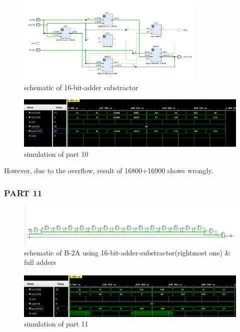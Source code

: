 \documentclass[pdftex,12pt,a4paper]{article}
\begin{document}
\begin{figure}[H]
    	\centering
    	\includegraphics[width=0.8\textwidth]{schematic/part10_sch.png}	
    	\caption{schematic of 16-bit-adder substractor}
    	\label{schematic of 16-bit-adder substractor}
    \end{figure}
    
    \begin{figure}[H]
    	\centering
    	\includegraphics[width=1\textwidth]{simulations/part10_result.png}	
    	\caption{simulation of part 10}
    	\label{simulation of part 10}
    \end{figure}

However, due to the overflow, result of 16800+16900 shows wrongly.

\subsubsection{PART 11}

\begin{figure}[H]
    	\centering
    	\includegraphics[width=1\textwidth]{schematic/part11_sch.png}	
    	\caption{schematic of B-2A using 16-bit-adder-substractor(rightmost one) \& full adders}
    	\label{schematic of B-2A using 16-bit-adder-substractor(rightmost one) & full adders}
    \end{figure}
    
    \begin{figure}[H]
    	\centering
    	\includegraphics[width=1\textwidth]{simulations/part11_result.png}	
    	\caption{simulation of part 11}
    	\label{simulation of part 11}
    \end{figure}
\end{document}
